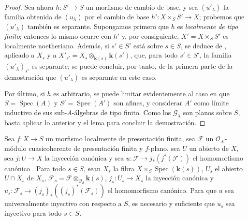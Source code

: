 \begin{proof}
Sea ahora $h:S'\to S$ un morfismo de cambio de base, y sea $(u'_\lambda)$ la familia obtenida de $(u_\lambda)$ por el cambio de base $h':X\times_S S'\to X$; probemos que $(u'_\lambda)$ también es separante.
Supongamos primero que $h$ es \emph{localmente de tipo finito}; entonces lo mismo ocurre con $h'$ y, por consiguiente, $X'=X\times_S S'$ es localmente noetheriano. Además, si $s'\in S'$ está sobre $s\in S$, se deduce de , aplicado a $X_s$ y a $X'_{s'}=X_s\otimes_{\mathbf{k}(s)}\boldsymbol{k}(s')$, que, para todo $s'\in S'$, la familia $(u'_\lambda)_{s'}$ es separante; se puede concluir, por tanto, de la primera parte de la demostración que $(u'_\lambda)$ es separante en este caso.

Por último, si $h$ es arbitrario, se puede limitar evidentemente al caso en que $S=\operatorname{Spec}(A)$ y $S'=\operatorname{Spec}(A')$ son afines, y considerar $A'$ como límite inductivo de sus sub-$A$-álgebras de tipo finito.
Como los $\mathcal G_\lambda$ son planos sobre $S$, basta aplicar lo anterior y el lema  para concluir la demostración.
\end{proof}

\begin{proposition}[11.9.17]
\label{IV.11.9.17}
Sea $f:X\to S$ un morfismo localmente de presentación finita, sea $\mathcal F$ un $\mathcal O_X$-módulo cuasicoherente de presentación finita y $f$-plano, sea $U$ un abierto de $X$, sea $j:U\to X$ la inyección canónica y sea $u:\mathcal F\to j_*(j^*(\mathcal F))$ el homomorfismo canónico .
Para todo $s\in S$, sean $X_s$ la fibra $X\times_S\operatorname{Spec}(\boldsymbol{k}(s))$, $U_s$ el abierto $U\cap X_s$ de $X_s$, $\mathcal F_s=\mathcal F\otimes_{\mathcal O_S}\boldsymbol{k}(s)$, $j_s:U_s\to X_s$ la inyección canónica y $u_s:\mathcal F_s\to(j_s)_*((j_s)^*(\mathcal F_s))$ el homomorfismo canónico.
Para que $u$ sea universalmente inyectivo con respecto a $S$, es necesario y suficiente que $u_s$ sea inyectivo para todo $s\in S$.
\end{proposition}

